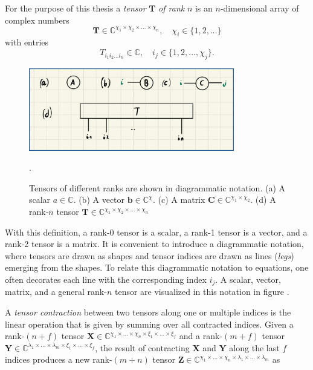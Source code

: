 For the purpose of this thesis a \textit{tensor} $\bm{T}$ \textit{of rank} $n$ is an $n$-dimensional array of complex numbers
\begin{equation}
	\bm{T} \in \mathbb{C}^{\chi_1\times\chi_2\times\dots\times\chi_n}, \quad \chi_i \in \{1, 2, \dots\}
\end{equation}
with entries
\begin{equation}
	T_{i_1i_2\dots i_n} \in \mathbb{C}, \quad i_j \in \{1, 2, \dots, \chi_j\}.
\end{equation}
\begin{figure}
	\centering
	\includegraphics[width=0.8\textwidth]{figures/Tensor_Networks/basic_tensor_diagrams.jpeg}
	\caption{Tensors of different ranks are shown in diagrammatic notation. (a) A scalar $a\in\mathbb{C}$. (b) A vector $\bm{b}\in\mathbb{C}^{\chi}$. (c) A matrix $\bm{C}\in\mathbb{C}^{\chi_1\times\chi_2}$. (d) A rank-$n$ tensor $\bm{T}\in\mathbb{C}^{\chi_1\times\chi_2\times\dots\times\chi_n}$}.
	\label{fig:basic_tensor_diagrams}
\end{figure}
With this definition, a rank-0 tensor is a scalar, a rank-1 tensor is a vector, and a rank-2 tensor is a matrix. It is convenient to introduce a diagrammatic notation, where tensors are drawn as shapes and tensor indices are drawn as lines (\textit{legs}) emerging from the shapes. To relate this diagrammatic notation to equations, one often decorates each line with the corresponding index $i_j$. A scalar, vector, matrix, and a general rank-$n$ tensor are visualized in this notation in figure .\par
A \textit{tensor contraction} between two tensors along one or multiple indices is the linear operation that is given by summing over all contracted indices. Given a rank-$(n+f)$ tensor $\bm{X} \in \mathbb{C}^{\chi_1\times\dots\times\chi_n\times\xi_{1}\times\dots\times\xi_{f}}$ and a rank-$(m+f)$ tensor $\bm{Y} \in \mathbb{C}^{\lambda_1\times\dots\times\lambda_m\times\xi_1\times\dots\times\xi_f}$, the result of contracting $\bm{X}$ and $\bm{Y}$ along the last $f$ indices produces a new rank-$(m+n)$ tensor $\bm{Z} \in \mathbb{C}^{\chi_1\times\dots\times\chi_n\times\lambda_1\times\dots\times\lambda_m}$ as
